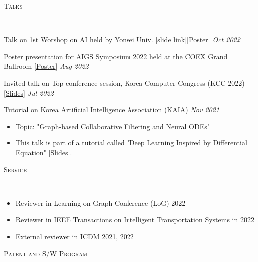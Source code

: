 \documentclass[10pt]{article}
\newenvironment{changemargin}[2]{
  \begin{list}{}{
    \setlength{\topsep}{0pt}
    \setlength{\leftmargin}{#1}
    \setlength{\rightmargin}{#2}
    \setlength{\listparindent}{\parindent}
    \setlength{\itemindent}{\parindent}
    \setlength{\parsep}{\parskip}
  }
  \item[]}{\end{list}
}
\newcommand{\lineover}{
	\begin{changemargin}{-0.05in}{-0.05in}
		\vspace*{-8pt}
		\hrulefill \\
		\vspace*{-2pt}
	\end{changemargin}
}
\newcommand{\header}[1]{
	\begin{changemargin}{-0.5in}{-0.5in}
		\scshape{#1}\\
  	\lineover
	\end{changemargin}
}
\newcommand{\award}[2]{
	{#1} \hfill \emph{#2}\\ \medskip
}
\newenvironment{body} {
	\vspace*{-16pt}
	\begin{changemargin}{-0.25in}{-0.5in}
  }
	{\end{changemargin}
}
\begin{document}
\medskip

\header{Talks}

\begin{body}
	\vspace{14pt}
\award{Talk on 1st Worshop on AI held by Yonsei Univ. [\href{https://www.dropbox.com/s/9au5xx13qa2l529/AAAI22_workshop.pdf?dl=0}{slide link}][\href{https://www.dropbox.com/s/pibzd51d76zy907/AAAI22-Yonsei_AI_Workshop.pdf?dl=0}{Poster}]}{Oct 2022}
\award{Poster presentation for AIGS Symposium 2022 held at the COEX Grand Ballroom [\href{https://www.dropbox.com/s/gfjsizak9s4cn9o/AAAI22-AIGS.pdf?dl=0}{Poster}]}{Aug 2022}
\award{Invited talk on Top-conference session,  Korea Computer Congress (KCC 2022) [\href{https://www.dropbox.com/s/22d9d92ns8uv9qw/AAAI22_KCC22.pdf?dl=0}{Slides}]}{Jul 2022}
\award{Tutorial on Korea Artificial Intelligence Association (KAIA)}{Nov 2021}
	\begin{itemize} \itemsep -0pt  %
        \item Topic: "Graph-based Collaborative Filtering and Neural ODEs"
		\item This talk is part of a tutorial called "Deep Learning Inspired by Differential Equation" [\href{https://www.dropbox.com/s/1xn8xhd6llmhblz/%5BKAIA2021%5DTutorial-LT-OCF.pdf?dl=0}{Slides}].
  	\end{itemize}
\end{body}

\medskip

\header{Service}

\begin{body}
	\vspace{14pt}
    \begin{itemize}
        \item Reviewer in Learning on Graph Conference (LoG) 2022
        \item Reviewer in IEEE Transactions on Intelligent Transportation Systems in 2022
        \item External reviewer in ICDM 2021, 2022
    \end{itemize}
\end{body}

\medskip


\header{Patent and S/W Program}
\end{document}
